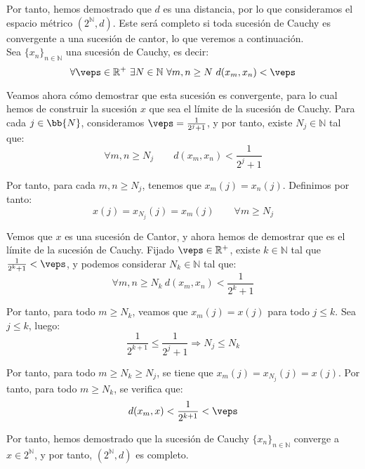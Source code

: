 \documentclass[12pt]{article}
\begin{document}
\begin{ejercicio}
    Por tanto, hemos demostrado que $d$ es una distancia, por lo que consideramos el espacio métrico $(2^\mathbb{N},d)$. Este será completo si toda sucesión de Cauchy es convergente a una sucesión de cantor, lo que veremos a continuación.\\

    Sea $\{x_n\}_{n\in \mathbb{N}}$ una sucesión de Cauchy, es decir:
    \begin{equation*}
        \forall \veps\in \mathbb{R}^+\ \exists N\in \mathbb{N}\ \forall m,n\geq N\ d(x_m,x_n) < \veps
    \end{equation*}

    Veamos ahora cómo demostrar que esta sucesión es convergente, para lo cual hemos de construir la sucesión $x$ que sea el límite de la sucesión de Cauchy. Para cada $j\in \bb{N}$, consideramos $\veps=\frac{1}{2^j+1}$, y por tanto, existe $N_j\in \mathbb{N}$ tal que:
    \begin{equation*}
        \forall m,n\geq N_j\qquad d(x_m,x_n) < \frac{1}{2^j+1}
    \end{equation*}

    Por tanto, para cada $m,n\geq N_j$, tenemos que $x_m(j)=x_n(j)$. Definimos por tanto:
    \begin{equation*}
        x(j) = x_{N_j}(j) = x_m(j) \qquad \forall m\geq N_j
    \end{equation*}

    Vemos que $x$ es una sucesión de Cantor, y ahora hemos de demostrar que es el límite de la sucesión de Cauchy. Fijado $\veps\in \mathbb{R}^+$, existe $k\in \mathbb{N}$ tal que $\frac{1}{2^k+1} < \veps$, y podemos considerar $N_k\in \mathbb{N}$ tal que:
    \begin{equation*}
        \forall m,n\geq N_k\ d(x_m,x_n) < \frac{1}{2^k+1}
    \end{equation*}

    Por tanto, para todo $m\geq N_k$, veamos que $x_m(j) = x(j)$ para todo $j\leq k$. Sea $j\leq k$, luego:
    \begin{equation*}
        \frac{1}{2^{k+1}}\leq \frac{1}{2^j+1}\Longrightarrow N_j\leq N_k
    \end{equation*}

    Por tanto, para todo $m\geq N_k\geq N_j$, se tiene que $x_m(j) = x_{N_j}(j) = x(j)$. Por tanto, para todo $m\geq N_k$, se verifica que:
    \begin{equation*}
        d(x_m,x) < \frac{1}{2^{k+1}} < \veps
    \end{equation*}

    Por tanto, hemos demostrado que la sucesión de Cauchy $\{x_n\}_{n\in \mathbb{N}}$ converge a $x\in 2^\mathbb{N}$, y por tanto, $(2^\mathbb{N},d)$ es completo.
\end{ejercicio}
\end{document}
